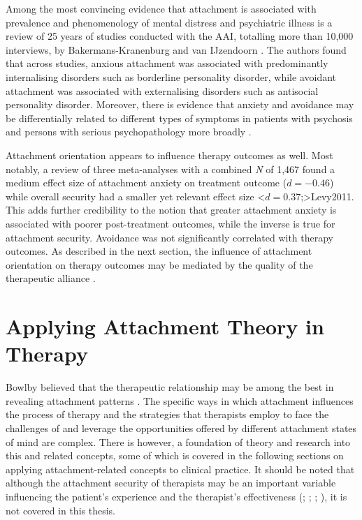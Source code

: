 \documentclass[12pt]{report}
\begin{document}
Among the most convincing evidence that attachment is associated with prevalence and phenomenology of mental distress and psychiatric illness is a review of 25 years of studies conducted with the AAI, totalling more than 10,000 interviews, by Bakermans-Kranenburg and van IJzendoorn \citeyear{Bakermanskranenburg2009}.
The authors found that across studies, anxious attachment was associated with predominantly internalising disorders such as borderline personality disorder, while avoidant attachment was associated with externalising disorders such as antisocial personality disorder.
Moreover, there is evidence that anxiety and avoidance may be differentially related to different types of symptoms in patients with psychosis  and persons with serious psychopathology more broadly \cite{Dozier1990}.

Attachment orientation appears to influence therapy outcomes as well.
Most notably, a review of three meta-analyses with a combined \textit{N} of 1,467 found a medium effect size of attachment anxiety on treatment outcome ($d=-0.46$) while overall security had a smaller yet relevant effect size \shortcite<$d=0.37$;>{Levy2011}.
This adds further credibility to the notion that greater attachment anxiety is associated with poorer post-treatment outcomes, while the inverse is true for attachment security.
Avoidance was not significantly correlated with therapy outcomes.
As described in the next section, the influence of attachment orientation on therapy outcomes may be mediated by the quality of the therapeutic alliance .

\section{Applying Attachment Theory in Therapy}
\label{sec:Applying attachment in therapy}
Bowlby believed that the therapeutic relationship may be among the best in revealing attachment patterns \cite{Bowlby1988}.
The specific ways in which attachment influences the process of therapy and the strategies that therapists employ to face the challenges of and leverage the opportunities offered by different attachment states of mind are complex.
There is however, a foundation of theory and research into this and related concepts, some of which is covered in the following sections on applying attachment-related concepts to clinical practice.
It should be noted that although the attachment security of therapists may be an important variable influencing the patient's experience and the therapist's effectiveness (; ; ; ), it is not covered in this thesis.
\end{document}
